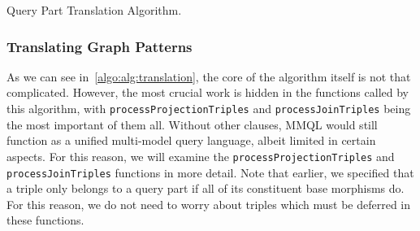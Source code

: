 \begin{algorithm}[ht]
\small
\DontPrintSemicolon
{}



\caption{Query Part Translation Algorithm.}
\label{algo:alg:translation}
\end{algorithm}

\subsubsection{Translating Graph Patterns}

As we can see in~\cref{algo:alg:translation}, the core of the algorithm itself is not that complicated.
However, the most crucial work is hidden in the functions called by this algorithm, with \texttt{processProjectionTriples} and \texttt{processJoinTriples} being the most important of them all.
Without other clauses, MMQL would still function as a unified multi-model query language, albeit limited in certain aspects.
For this reason, we will examine the \texttt{processProjectionTriples} and \texttt{processJoinTriples} functions in more detail.
Note that earlier, we specified that a triple only belongs to a query part if all of its constituent base morphisms do.
For this reason, we do not need to worry about triples which must be deferred in these functions.

